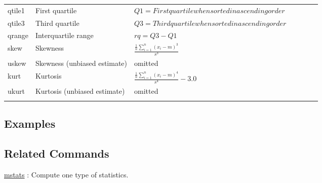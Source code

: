 \begin{table}[t]
{\begin{tabular}{lp{4cm}lp{4cm}lp{3cm}l}
qtile1 & First quartile      & $Q1=First quartile when sorted in ascending order$ & \\
qtile3 & Third quartile      & $Q3=Third quartile when sorted in ascending order$ & \\
qrange & Interquartile range       & $rq=Q3-Q1$ & \\
skew   & Skewness             & $\frac{\frac{1}{n}\sum_{i=1}^n (x_i-m)^3}{s^3}$ & \\
uskew  & Skewness (unbiased estimate) & omitted & \\
kurt   & Kurtosis             & $\frac{\frac{1}{n}\sum_{i=1}^n (x_i-m)^4}{s^4}-3.0$ & \\
ukurt  & Kurtosis (unbiased estimate) & omitted & \\
\hline \\
\end{tabular}
}
\end{table}


\subsection*{Examples}

\subsection*{Related Commands}
\hyperref[sect:mstats]{mstats} : Compute one type of statistics. 

%
